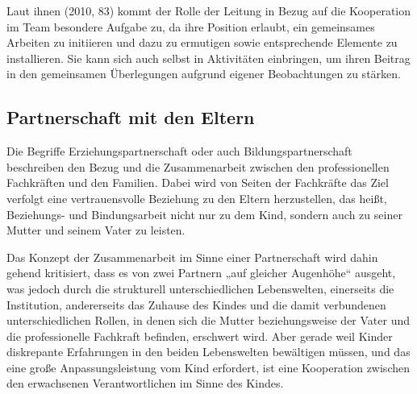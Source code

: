 Laut ihnen (2010, 83) kommt der Rolle der Leitung in Bezug auf die Kooperation im Team besondere Aufgabe zu, da ihre Position erlaubt, ein gemeinsames Arbeiten zu initiieren und dazu zu ermutigen sowie entsprechende Elemente zu installieren. Sie kann sich auch selbst in Aktivitäten einbringen, um ihren Beitrag in den gemeinsamen Überlegungen aufgrund eigener Beobachtungen zu stärken.

\subsection{Partnerschaft mit den Eltern}
Die Begriffe Erziehungspartnerschaft oder auch Bildungspartnerschaft beschreiben den Bezug und die Zusammenarbeit zwischen den professionellen Fachkräften und den Familien. Dabei wird von Seiten der Fachkräfte das Ziel verfolgt eine vertrauensvolle Beziehung zu den Eltern herzustellen, das heißt, Beziehungs- und Bindungsarbeit nicht nur zu dem Kind, sondern auch zu seiner Mutter und seinem Vater zu leisten. 

Das Konzept der Zusammenarbeit im Sinne einer Partnerschaft wird dahin gehend kritisiert, dass es von zwei Partnern „auf gleicher Augenhöhe“ ausgeht, was jedoch durch die strukturell unterschiedlichen Lebenswelten, einerseits die Institution, andererseits das Zuhause des Kindes und die damit verbundenen unterschiedlichen Rollen, in denen sich die Mutter beziehungsweise der Vater und die professionelle Fachkraft befinden, erschwert wird. Aber gerade weil Kinder diskrepante Erfahrungen in den beiden Lebenswelten bewältigen müssen, und das eine große Anpassungsleistung vom Kind erfordert, ist eine Kooperation zwischen den erwachsenen Verantwortlichen im Sinne des Kindes. 


